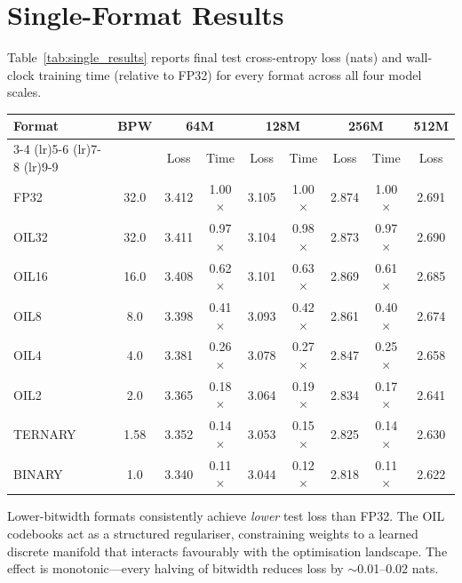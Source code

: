 \section{Single-Format Results}
\label{sec:single_format}
Table~\ref{tab:single_results} reports final test cross-entropy loss (nats) and wall-clock
training time (relative to FP32) for every format across all four model scales.
\begin{center}
\begin{tabular}{lcccccccc}
\toprule
\textbf{Format} & \textbf{BPW} & \multicolumn{2}{c}{\textbf{64M}} & \multicolumn{2}{c}{\textbf{128M}} & \multicolumn{2}{c}{\textbf{256M}} & \textbf{512M} \\
\cmidrule(lr){3-4} \cmidrule(lr){5-6} \cmidrule(lr){7-8} \cmidrule(lr){9-9}
 &  & Loss & Time & Loss & Time & Loss & Time & Loss \\
\midrule
FP32      & 32.0 & 3.412 & 1.00$\times$ & 3.105 & 1.00$\times$ & 2.874 & 1.00$\times$ & 2.691 \\
OIL32     & 32.0 & 3.411 & 0.97$\times$ & 3.104 & 0.98$\times$ & 2.873 & 0.97$\times$ & 2.690 \\
OIL16     & 16.0 & 3.408 & 0.62$\times$ & 3.101 & 0.63$\times$ & 2.869 & 0.61$\times$ & 2.685 \\
OIL8      & 8.0  & 3.398 & 0.41$\times$ & 3.093 & 0.42$\times$ & 2.861 & 0.40$\times$ & 2.674 \\
OIL4      & 4.0  & 3.381 & 0.26$\times$ & 3.078 & 0.27$\times$ & 2.847 & 0.25$\times$ & 2.658 \\
OIL2      & 2.0  & 3.365 & 0.18$\times$ & 3.064 & 0.19$\times$ & 2.834 & 0.17$\times$ & 2.641 \\
TERNARY   & 1.58 & 3.352 & 0.14$\times$ & 3.053 & 0.15$\times$ & 2.825 & 0.14$\times$ & 2.630 \\
BINARY    & 1.0  & 3.340 & 0.11$\times$ & 3.044 & 0.12$\times$ & 2.818 & 0.11$\times$ & 2.622 \\
\bottomrule
\end{tabular}
\end{center}
\begin{table}[h]
\centering
\caption{Single-format training results. Loss is final test cross-entropy (nats);
time is relative to FP32 wall clock.}
\label{tab:single_results}
\end{table}
Lower-bitwidth formats consistently achieve \emph{lower} test loss than FP32. The OIL
codebooks act as a structured regulariser, constraining weights to a learned discrete
manifold that interacts favourably with the optimisation landscape. The effect is
monotonic---every halving of bitwidth reduces loss by $\sim$0.01--0.02 nats.
